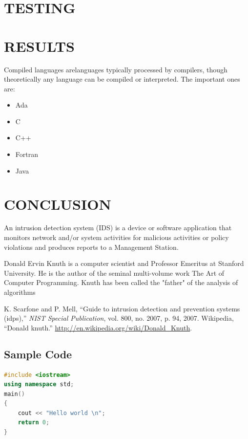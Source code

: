 \documentclass{fisatproject}
\begin{document}
\chapter{TESTING}

\chapter{RESULTS}

Compiled languages arelanguages typically processed by compilers, though theoretically any language can be compiled or interpreted. The important ones are:
\begin{itemize}
\item Ada
\item C
\item C++
\item Fortran
\item Java
\end{itemize}

\chapter{CONCLUSION}

An intrusion detection system (IDS) \cite{nist} is a device or software application that monitors network and/or system activities for malicious activities or policy violations and produces reports to a Management Station.


Donald Ervin Knuth \cite{knuth} is a computer scientist and Professor Emeritus at Stanford University. He is the author of the seminal multi-volume work The Art of Computer Programming. Knuth has been called the "father" of the analysis of algorithms


\begin{thebibliography}{1}
 K. Scarfone and P. Mell, ``Guide to intrusion detection and prevention systems
(idps),'' \textit{NIST Special Publication}, vol. 800, no. 2007, p. 94, 2007.
 Wikipedia, ``Donald knuth.'' \url{http://en.wikipedia.org/wiki/Donald_Knuth}.
\end{thebibliography}

\begin{appendices}
\chapter{Sample Code}
\begin{lstlisting}[language=c++]
#include <iostream>
using namespace std;
main()
{
	cout << "Hello world \n";
	return 0;
}
\end{lstlisting}
\end{appendices}
\end{document}
